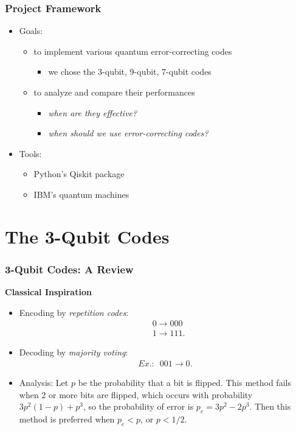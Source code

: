 \documentclass{beamer}
\begin{document}
\begin{frame}
    \frametitle{Project Framework}
    \begin{itemize}
        \item Goals: 
        \begin{itemize}
            \item to implement various quantum error-correcting codes
            \begin{itemize}
                \item we chose the 3-qubit, 9-qubit, 7-qubit codes
            \end{itemize}
            \item to analyze and compare their performances 
            \begin{itemize}
                \item \textit{when are they effective?}
                \item \textit{when should we use error-correcting codes?}
            \end{itemize} 
        \end{itemize}
        \item Tools:
        \begin{itemize}
            \item Python's Qiskit package
            \item IBM's quantum machines
        \end{itemize}
    \end{itemize}
\end{frame}

\section{The 3-Qubit Codes}
\begin{frame}
    \frametitle{3-Qubit Codes: A Review}
    \textbf{Classical Inspiration}
    \begin{itemize}
        \item Encoding by \textit{repetition codes}:
        \begin{align*}
            &0 \rightarrow 000 \\
            &1 \rightarrow 111.
        \end{align*}
        \item Decoding by \textit{majority voting}:
        \begin{align*}
            \textit{Ex.: }\,\, 001 \rightarrow 0.
        \end{align*}
        \item Analysis: Let $p$ be the probability that a bit is flipped. This method fails when 2 or more bits are flipped, which occurs with probability $3p^2(1-p)+p^3$, so the probability of error is $p_e = 3p^2-2p^3$. Then this method is preferred when $p_e < p$, or $p < 1/2$.
    \end{itemize}
\end{frame}
\end{document}
